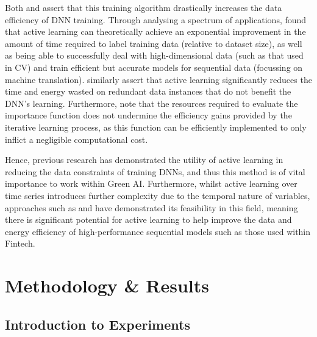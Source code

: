 \documentclass[a4paper, 11pt]{report}
\begin{document}
    Both \citet{ren-2021} and \citet{xu-2021} assert that this training algorithm drastically increases the data efficiency of DNN training. Through analysing a spectrum of applications, \citet{ren-2021} found that active learning can theoretically achieve an exponential improvement in the amount of time required to label training data (relative to dataset size), as well as being able to successfully deal with high-dimensional data (such as that used in CV) and train efficient but accurate models for sequential data (focussing on machine translation). \citet{xu-2021} similarly assert that active learning significantly reduces the time and energy wasted on redundant data instances that do not benefit the DNN's learning. Furthermore, \citet{ren-2021} note that the resources required to evaluate the importance function does not undermine the efficiency gains provided by the iterative learning process, as this function can be efficiently implemented to only inflict a negligible computational cost. 

    Hence, previous research has demonstrated the utility of active learning in reducing the data constraints of training DNNs, and thus this method is of vital importance to work within Green AI. Furthermore, whilst active learning over time series introduces further complexity due to the temporal nature of variables, approaches such as \citet{peng-2017} and \citet{zimmer-2018} have demonstrated its feasibility in this field, meaning there is significant potential for active learning to help improve the data and energy efficiency of high-performance sequential models such as those used within Fintech.


    \newpage
    \chapter{Methodology \& Results}
    \label{chapter: experiments}

    \section{Introduction to Experiments}
\end{document}
